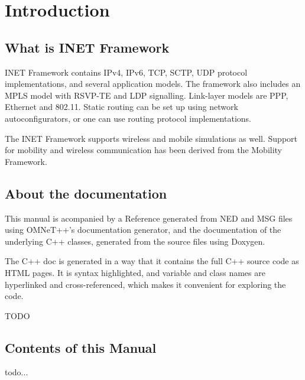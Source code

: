 \chapter{Introduction}
\label{cha:introduction}


\section{What is INET Framework}

INET Framework contains IPv4, IPv6, TCP, SCTP, UDP protocol implementations,
and several application models. The framework also includes an MPLS model
with RSVP-TE and LDP signalling. Link-layer models are PPP, Ethernet and 802.11.
Static routing can be set up using network autoconfigurators, or one can use
routing protocol implementations.

The INET Framework supports wireless and mobile simulations as well. Support
for mobility and wireless communication has been derived from the
Mobility Framework.


\section{About the documentation}

This manual is acompanied by a Reference generated from NED and MSG files using
OMNeT++'s documentation generator, and the documentation of the underlying C++ classes,
generated from the source files using Doxygen.

The C++ doc is generated in a way that it contains the full C++ source code
as HTML pages. It is syntax highlighted, and variable and class names are hyperlinked
and cross-referenced, which makes it convenient for exploring the code.


\ifdraft TODO
\section{Contents of this Manual}

todo...
\fi



